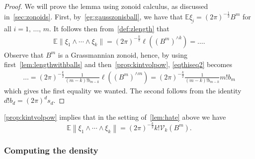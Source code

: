 \documentclass[AHL, Unicode, longabstracts, published]{cedram}
\newcommand{\EE}{\mathbb{E}}
\newcommand{\Vint}{\mathcal{V}}
\newcommand{\seg}{\underline}
\newcommand{\uball}{b}
\begin{document}
\begin{proof}
We will prove the lemma using zonoid calculus, as discussed in~\cref{sec:zonoids}. First, by~\cref{eg:gausszonisball}, we have that $\EE\seg{\xi_i}=(2\pi)^{-\tfrac12} B^m$ for all $i=1,\,\ldots,\,m$. It follows then from~\cref{def:zlength} that
\begin{equation}\label{eqthiseq2}
\begin{split}
\EE\|\xi_1\wedge\cdots\wedge\xi_k\|=(2\pi)^{-\frac k2}\ell\left((B^m)^{\wedge k}\right)=\dots.
\end{split}
\end{equation}
Observe that $B^m$ is a Grassmannian zonoid, hence, by using first~\cref{lem:lengthwithballs} and then~\cref{prop:kintvolpow}, \eqref{eqthiseq2} becomes
\begin{equation*}
\begin{split}
\dots=(2\pi)^{-\frac k2}\frac{1}{(m-k)!\uball_{m-k}}\ell\left((B^m)^{\wedge m}\right)=(2\pi)^{-\frac k2}\frac{1}{(m-k)!\uball_{m-k}}m!\uball_m
\end{split}
\end{equation*}
which gives the first equality we wanted. The second follows from the identity $d!\uball_d=(2\pi)^ds_d$.
\end{proof}

\begin{rema}
\cref{prop:kintvolpow} implies that in the setting of~\cref{lem:hate} above we have
\begin{equation}\label{eq:plugin}
\EE\left\|\xi_1\wedge\cdots\wedge\xi_k\right\|=(2\pi)^{-\frac k2}k!\Vint_k(B^m).
\end{equation}
\end{rema}

\subsubsection{Computing the density} 
\end{document}
